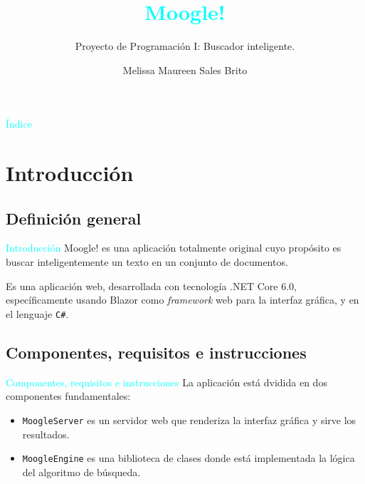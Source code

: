 \documentclass[a4paper, 12pt]{beamer}
\title{\textcolor{cyan}{Moogle!}}
\subtitle{Proyecto de Programación I: Buscador inteligente.}
\author{Melissa Maureen Sales Brito}
\institute{MatCom}
\date{}
\begin{document}
\maketitle

\begin{frame}{\textcolor{cyan}{Índice}}
\tableofcontents
\end{frame}

\section{Introducción}

\subsection{Definición general}
\begin{frame}{\textcolor{cyan}{Introducción}}
Moogle! es una aplicación totalmente original cuyo propósito es buscar inteligentemente un texto en un conjunto de documentos.


Es una aplicación web, desarrollada con tecnología .NET Core 6.0, específicamente usando Blazor como {\it framework} web para la interfaz gráfica, y en el lenguaje {\tt C\#}. 
\end{frame}

\subsection{Componentes, requisitos e instrucciones}

\begin{frame}{\textcolor{cyan}{Componentes, requisitos e instrucciones}}
    La aplicación está dvidida en dos componentes fundamentales:
    \begin{itemize}
        \item {\tt MoogleServer} es un servidor web que renderiza la interfaz gráfica y sirve los resultados.
        \item {\tt MoogleEngine} es una biblioteca de clases donde está implementada la lógica del algoritmo de búsqueda.     
    \end{itemize}
\end{frame}
\end{document}
